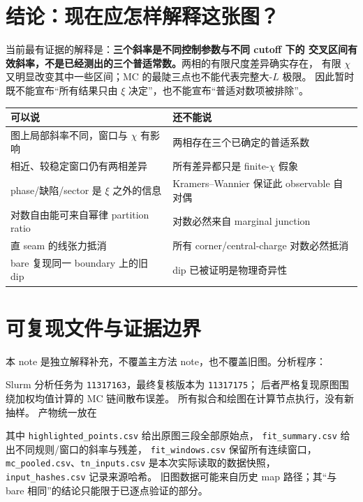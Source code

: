 \documentclass[11pt]{article}
\newcommand{\note}[1]{\par\noindent\colorbox{blue!5}{\parbox{0.95\linewidth}{#1}}\par}
\begin{document}
\section{结论：现在应怎样解释这张图？}
\note{当前最有证据的解释是：\textbf{三个斜率是不同控制参数与不同 cutoff 下的
交叉区间有效斜率，不是已经测出的三个普适常数。}两相的有限尺度差异确实存在，
有限 $\chi$ 又明显改变其中一些区间；MC 的最陡三点也不能代表完整大-$L$ 极限。
因此暂时既不能宣布“所有结果只由 $\xi$ 决定”，也不能宣布“普适对数项被排除”。}

\begin{center}\small
\begin{tabular}{p{.42\linewidth}p{.46\linewidth}}
\toprule
可以说 & 还不能说\\
\midrule
图上局部斜率不同，窗口与 $\chi$ 有影响 & 两相存在三个已确定的普适系数\\
相近、较稳定窗口仍有两相差异 & 所有差异都只是 finite-$\chi$ 假象\\
phase/缺陷/sector 是 $\xi$ 之外的信息 & Kramers--Wannier 保证此 observable 自对偶\\
对数自由能可来自幂律 partition ratio & 对数必然来自 marginal junction\\
直 seam 的线张力抵消 & 所有 corner/central-charge 对数必然抵消\\
bare 复现同一 boundary 上的旧 dip & dip 已被证明是物理奇异性\\
\bottomrule
\end{tabular}
\end{center}

\appendix
\section{可复现文件与证据边界}
本 note 是独立解释补充，不覆盖主方法 note，也不覆盖旧图。分析程序：
\begin{quote}\small
{}
\end{quote}
Slurm 分析任务为 \texttt{11317163}，最终复核版本为 \texttt{11317175}；
后者严格复现原图围绕加权均值计算的 MC 链间散布误差。
所有拟合和绘图在计算节点执行，没有新抽样。
产物统一放在
\begin{quote}\small{}\end{quote}
其中 \texttt{highlighted\_points.csv} 给出原图三段全部原始点，
\texttt{fit\_summary.csv} 给出不同规则/窗口的斜率与残差，
\texttt{fit\_windows.csv} 保留所有连续窗口，
\texttt{mc\_pooled.csv}、\texttt{tn\_inputs.csv} 是本次实际读取的数据快照，
\texttt{input\_hashes.csv} 记录来源哈希。
旧图数据可能来自历史 map 路径；其“与 bare 相同”的结论只能限于已逐点验证的部分。
\end{document}

